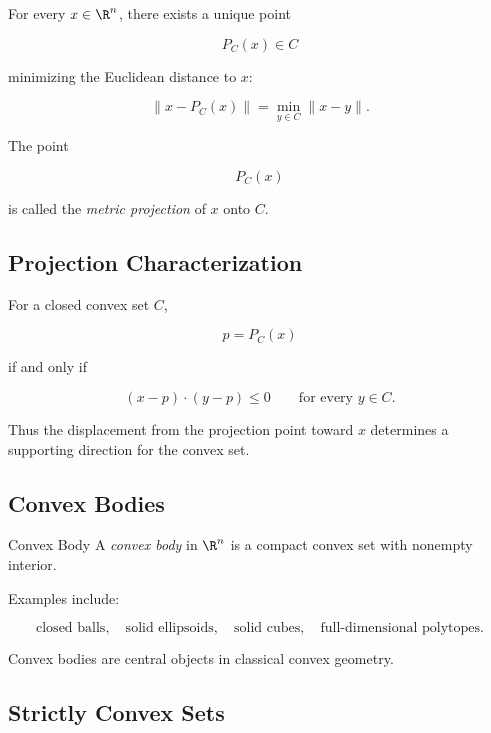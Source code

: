 For every \(x\in\R^n\), there exists a unique point

\[
P_C(x)\in C
\]

minimizing the Euclidean distance to \(x\):

\[
\boxed{
\|x-P_C(x)\|
=
\min_{y\in C}\|x-y\|.
}
\]

The point

\[
P_C(x)
\]

is called the \emph{metric projection} of \(x\) onto \(C\).

\subsection{Projection Characterization}
\label{subsec:convex-projection-characterization}

For a closed convex set \(C\),

\[
p=P_C(x)
\]

if and only if

\[
\boxed{
(x-p)\cdot(y-p)\leq0
\qquad
\text{for every }y\in C.
}
\]

Thus the displacement from the projection point toward \(x\) determines a
supporting direction for the convex set.

\subsection{Convex Bodies}
\label{subsec:convex-bodies}

\begin{definitionbox}{Convex Body}
A \emph{convex body} in \(\R^n\) is a compact convex set with nonempty
interior.
\end{definitionbox}

Examples include:

\[
\boxed{
\text{closed balls},
\quad
\text{solid ellipsoids},
\quad
\text{solid cubes},
\quad
\text{full-dimensional polytopes}.
}
\]

Convex bodies are central objects in classical convex geometry.

\subsection{Strictly Convex Sets}
\label{subsec:strictly-convex-sets}

